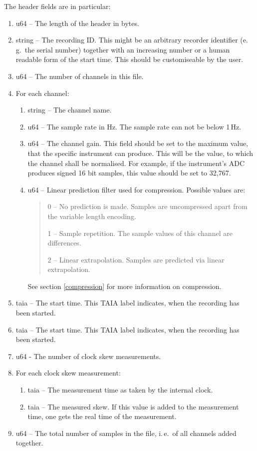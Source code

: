 \documentclass[DIV=10]{scrartcl}
\begin{document}
The header fields are in particular:
\begin{enumerate}
  \item u64 ­­­­– The length of the header in bytes.
  \item string – The recording ID.
  This might be an arbitrary recorder identifier (e.\,g.\ the serial number) together with an increasing number or a human readable form of the start time.
  This should be customiseable by the user.
  \item u64 – The number of channels in this file.
  \item For each channel:
  \begin{enumerate}
    \item string – The channel name.
    \item u64 – The sample rate in Hz.
    The sample rate can not be below 1\,Hz.
    \item u64 – The channel gain.
    This field should be set to the maximum value, that the specific instrument can produce.
    This will be the value, to which the channel shall be normalised.
    For example, if the instrument’s ADC produces signed 16 bit samples, this value should be set to 32,767.
    \item u64 – Linear prediction filter used for compression.
    Possible values are:
    \begin{quote}
      0 – No prediction is made. Samples are uncompressed apart from the variable length encoding.

      1 – Sample repetition. The sample values of this channel are differences.

      2 – Linear extrapolation. Samples are predicted via linear extrapolation.
    \end{quote}
    See section \ref{compression} for more information on compression.
  \end{enumerate}
  \item taia – The start time.
  This TAIA label indicates, when the recording has been started.
  \item taia – The start time.
  This TAIA label indicates, when the recording has been started.
  \item u64 - The number of clock skew measurements.
  \item For each clock skew measurement:
  \begin{enumerate}
    \item taia – The measurement time as taken by the internal clock.
    \item taia – The measured skew.
    If this value is added to the measurement time, one gets the real time of the measurement.
  \end{enumerate}
  \item u64 – The total number of samples in the file, i.\,e.\ of all channels added together.
\end{enumerate}
\end{document}
